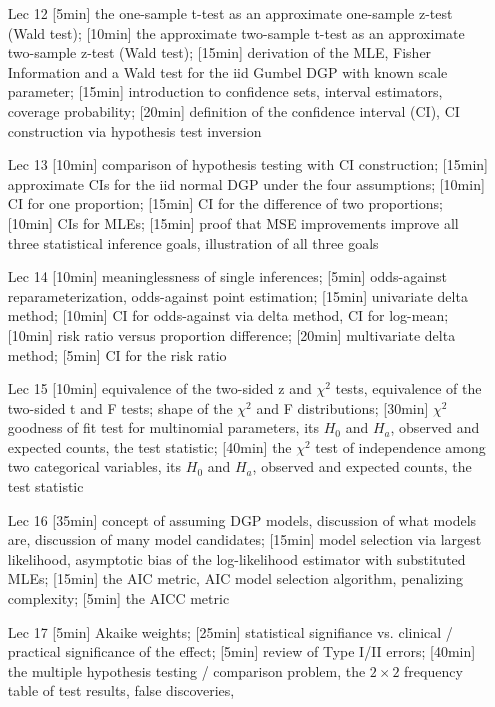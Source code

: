 \documentclass[12pt]{article}
\begin{document}
\begin{enumerate}
\item[Lec 12] [5min] the one-sample t-test as an approximate one-sample z-test (Wald test); [10min] the approximate two-sample t-test as an approximate two-sample z-test (Wald test); [15min] derivation of the MLE, Fisher Information and a Wald test for the iid Gumbel DGP with known scale parameter; [15min] introduction to confidence sets, interval estimators, coverage probability; [20min] definition of the confidence interval (CI), CI construction via hypothesis test inversion

\item[Lec 13] [10min] comparison of hypothesis testing with CI construction; [15min] approximate CIs for the iid normal DGP under the four assumptions; [10min] CI for one proportion; [15min] CI for the difference of two proportions; [10min] CIs for MLEs; [15min] proof that MSE improvements improve all three statistical inference goals, illustration of all three goals

\item[Lec 14] [10min] meaninglessness of single inferences; [5min] odds-against reparameterization, odds-against point estimation; [15min] univariate delta method; [10min] CI for odds-against via delta method, CI for log-mean; [10min] risk ratio versus proportion difference; [20min] multivariate delta method; [5min] CI for the risk ratio

\item[Lec 15] [10min] equivalence of the two-sided z and $\chi^2$ tests, equivalence of the two-sided t and F tests; shape of the $\chi^2$ and F distributions; [30min] $\chi^2$ goodness of fit test for multinomial parameters, its $H_0$ and $H_a$, observed and expected counts, the test statistic; [40min] the $\chi^2$ test of independence among two categorical variables, its $H_0$ and $H_a$, observed and expected counts, the test statistic

\item[Lec 16] [35min] concept of assuming DGP models, discussion of what models are, discussion of many model candidates; [15min] model selection via largest likelihood, asymptotic bias of the log-likelihood estimator with substituted MLEs; [15min] the AIC metric, AIC model selection algorithm, penalizing complexity; [5min] the AICC metric

\item[Lec 17] [5min] Akaike weights; [25min] statistical signifiance vs. clinical / practical significance of the effect; [5min] review of Type I/II errors; [40min] the multiple hypothesis testing / comparison problem, the $2 \times 2$ frequency table of test results, false discoveries,  


\end{enumerate}
\end{document}

